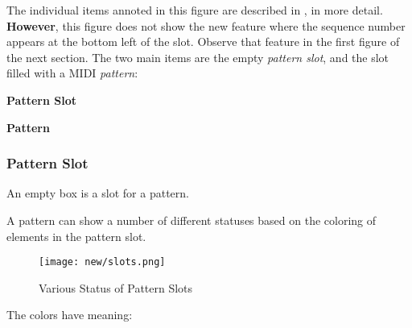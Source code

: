    The individual items annoted in this figure are described in
   , in more detail.
   \textbf{However}, this figure does not show the new feature where the
   sequence number appears at the bottom left of the slot.  Observe that
   feature in the first figure of the next section.
   The two main items are the empty \textsl{pattern slot}, and the slot filled
   with a MIDI \textsl{pattern}:

   \begin{enumber}
      \item \textbf{Pattern Slot}
      \item \textbf{Pattern}
   \end{enumber}

\subsubsection{Pattern Slot}
\label{subsubsec:seq64_patterns_pattern_slot}

   An empty box is a slot for a pattern.

   A pattern can show a number of different statuses based on the coloring
   of elements in the pattern slot. 

\begin{figure}[H]
   \centering 
   \texttt{[image: new/slots.png]}
   \caption{Various Status of Pattern Slots}
   \label{fig:pattern_slots_statuses}
\end{figure}

   The colors have meaning:

